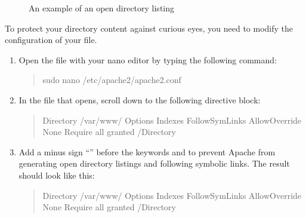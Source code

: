 \documentclass[letterpaper,10pt,english]{sphinxmanual}
\begin{document}
\begin{figure}[htbp]
\centering
\capstart

\noindent{}
\caption{An example of an open directory listing}\label{\detokenize{hardening-apache:id2}}\end{figure}

\sphinxAtStartPar
To protect your directory content against curious eyes, you need to modify the configuration of your  file.
\begin{enumerate}
%
\item {} 
\sphinxAtStartPar
Open the file with your nano editor by typing the following command:
\begin{quote}

\begin{sphinxVerbatim}[commandchars=\\\{\}]
\PYGZdl{} sudo nano /etc/apache2/apache2.conf
\end{sphinxVerbatim}
\end{quote}

\item {} 
\sphinxAtStartPar
In the file that opens, scroll down to the following directive block:
\begin{quote}

\begin{sphinxVerbatim}[commandchars=\\\{\}]
\PYGZlt{}Directory /var/www/\PYGZgt{}
        Options Indexes FollowSymLinks
        AllowOverride None
        Require all granted
\PYGZlt{}/Directory\PYGZgt{}
\end{sphinxVerbatim}
\end{quote}

\item {} 
\sphinxAtStartPar
Add a minus sign “\sphinxhyphen{}” before the keywords  and  to prevent Apache from generating open directory listings and following symbolic links. The result should look like this:
\begin{quote}

\begin{sphinxVerbatim}[commandchars=\\\{\}]
\PYGZlt{}Directory /var/www/\PYGZgt{}
        Options \PYGZhy{}Indexes \PYGZhy{}FollowSymLinks
        AllowOverride None
        Require all granted
\PYGZlt{}/Directory\PYGZgt{}
\end{sphinxVerbatim}
\end{quote}


\end{enumerate}
\end{document}
